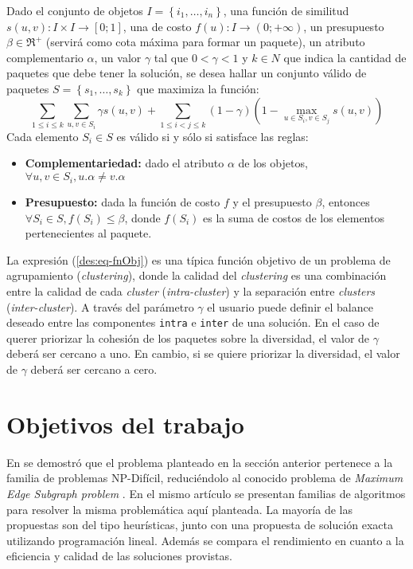 Dado el conjunto de objetos $I=\left\{i_1,\ldots, i_n\right\}$, una función de similitud $s(u,v): I \times I \rightarrow [0;1]$, una de costo $f(u): I \rightarrow (0;+\infty)$, un presupuesto $\beta \in \Re^{+}$ (servirá como cota máxima para formar un paquete), un atributo complementario $\alpha$, un valor $\gamma$ tal que $0 < \gamma < 1$ y $k \in N$ que indica la cantidad de paquetes que debe tener la solución, se desea hallar un conjunto válido de paquetes $S = \left\{s_1, \ldots, s_k\right\}$ que maximiza la función:
\begin{equation} \label{des:eq-fnObj}
\sum_{1 \leq i \leq k}{\sum_{u,v \in S_i}{\gamma s(u,v)}} + \sum_{1 \leq i < j \leq k}{(1-\gamma) (1-\max_{u \in S_i, v \in S_j}{s(u,v)})}
\end{equation}
Cada elemento $S_i \in S$ es válido si y sólo si satisface las reglas:
\begin{itemize}
	\item \textbf{Complementariedad:} dado el atributo $\alpha$ de los objetos, $\forall u,v \in S_i, u.\alpha \neq v.\alpha$
	\item \textbf{Presupuesto:} dada la función de costo $f$ y el presupuesto $\beta$, entonces $\forall S_i \in S, f(S_i) \leq \beta$, donde $f(S_i)$ es la suma de costos de los elementos pertenecientes al paquete.
\end{itemize}		  

La expresión (\ref{des:eq-fnObj}) es una típica función objetivo de un problema de agrupamiento ({\em clustering}), donde la calidad del {\em clustering} es una combinación entre la calidad de cada {\em cluster} ({\em intra-cluster}) y la separación entre {\em clusters} ({\em inter-cluster}). A través del parámetro $\gamma$ el usuario puede definir el balance deseado entre las componentes \texttt{intra} e \texttt{inter} de una solución. En el caso de querer priorizar la cohesión de los paquetes sobre la diversidad, el  valor de $\gamma$ deberá ser cercano a uno. En cambio, si se quiere priorizar la diversidad, el valor de $\gamma$ deberá ser cercano a cero.

\section{Objetivos del trabajo}
En \cite{journals/tkde/Amer-YahiaBCFMZ14} se demostró que el problema planteado en la sección anterior pertenece a la familia de problemas NP-Difícil, reduciéndolo al conocido problema de {\em Maximum Edge Subgraph problem} \cite{finding_maximum_density_subgraph}. En el mismo artículo se presentan familias de algoritmos para resolver la misma problemática aquí planteada. La mayoría de las propuestas son del tipo heurísticas, junto con una propuesta de solución exacta utilizando programación lineal. Además se compara el rendimiento en cuanto a la eficiencia y calidad de las soluciones provistas.


